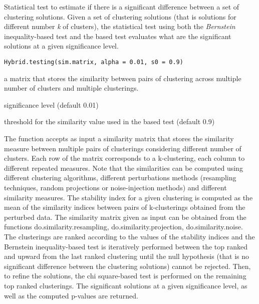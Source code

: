 \documentclass{article}
\begin{document}
\begin{Description}\relax
Statistical test to estimate if there is a significant difference between a set of clustering solutions.
Given a set of clustering solutions (that is solutions for different number \emph{k} of clusters),
the statistical test using both the \emph{Bernstein} inequality-based test and the  based test evaluates
what are the significant solutions at a given significance level.
\end{Description}
\begin{Usage}
\begin{verbatim}
Hybrid.testing(sim.matrix, alpha = 0.01, s0 = 0.9)
\end{verbatim}
\end{Usage}
\begin{Arguments}
\begin{ldescription}
\item[\code{sim.matrix}] a matrix that stores the similarity between pairs of clustering across multiple number of clusters
and multiple clusterings.
\item[\code{alpha}] significance level (default 0.01) 
\item[\code{s0}] threshold for the similarity value used in the  based test (default 0.9) 
\end{ldescription}
\end{Arguments}
\begin{Details}\relax
The function accepts as input  a similarity matrix that stores the similarity measure between multiple pairs of clusterings 
considering different number of clusters. Each row of the matrix corresponds to a k-clustering, each column to different repeated 
measures.
Note that the similarities can be computed using different clustering algorithms, different perturbations methods 
(resampling techniques, random projections or noise-injection methods) and different similarity measures. 
The stability index for a given clustering is computed as the mean of the similarity indices between pairs of 
k-clusterings obtained from the perturbed data. The similarity matrix given as input can be obtained from the functions
do.similarity.resampling, do.similarity.projection, do.similarity.noise.
The clusterings are ranked according to the values of the stability indices and the Bernstein inequality-based test is iteratively performed
between the top ranked and upward from the last ranked clustering until the null hypothesis (that is no significant difference between the clustering
solutions) cannot be rejected. Then, to refine the solutions, the chi square-based test is performed on the remaining top ranked clusterings.
The significant solutions at a given \eqn{\alpha}{} significance level, as well as the computed p-values are returned.
\end{Details}
\end{document}
